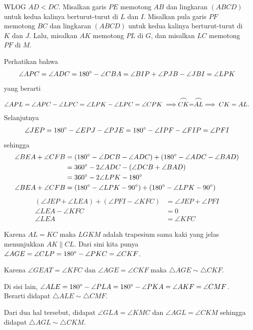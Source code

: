 WLOG $AD < DC$. Misalkan garis $PE$ memotong $AB$ dan lingkaran $(ABCD)$ untuk kedua kalinya berturut-turut di $L$ dan $I$. Misalkan pula garis $PF$ memotong $BC$ dan lingkaran $(ABCD)$ untuk kedua kalinya berturut-turut di $K$ dan $J$. Lalu, misalkan $AK$ memotong $PL$ di $G$, dan misalkan $LC$ memotong $PF$ di $M$.

Perhatikan bahwa
\begin{align*}
    \angle APC = \angle ADC = 180^\circ - \angle CBA = \angle BIP + \angle PJB - \angle JBI = \angle LPK
\end{align*}
yang berarti
\begin{align*}
    \angle APL = \angle APC - \angle LPC = \angle LPK - \angle LPC = \angle CPK \implies \stackrel{\mbox{\large$\frown$}}{CK} = \stackrel{\mbox{\large$\frown$}}{AL} \implies CK = AL.
\end{align*}
Selanjutnya
\begin{align*}
    \angle JEP = 180^\circ - \angle EPJ - \angle PJE = 180^\circ - \angle IPF - \angle FIP = \angle PFI
\end{align*}
sehingga
\begin{align*}
    \angle BEA + \angle CFB &= (180^\circ - \angle DCB - \angle ADC) + (180^\circ - \angle ADC - \angle BAD)\\
    &= 360^\circ - 2\angle ADC - (\angle DCB + \angle BAD)\\
    &= 360^\circ  - 2\angle LPK - 180^\circ\\
    \angle BEA + \angle CFB &= (180^\circ - \angle LPK - 90^\circ) + (180^\circ - \angle LPK - 90^\circ)
\end{align*}
\begin{align*}
     (\angle JEP + \angle LEA) + (\angle PFI - \angle KFC)  &= \angle JEP + \angle PFI\\
     \angle LEA - \angle KFC &= 0\\
     \angle LEA &= \angle KFC
\end{align*}

Karena $AL = KC$ maka $LGKM$ adalah trapesium sama kaki yang jelas menunjukkan $AK \parallel CL$. Dari sini kita punya
$\angle AGE = \angle CLP = 180^\circ - \angle PKC = \angle CKF$.

Karena $\angle GEA T= \angle KFC$ dan $\angle AGE = \angle CKF$ maka $\triangle AGE \sim \triangle CKF$.

Di sisi lain, $\angle ALE = 180^\circ - \angle PLA = 180^\circ - \angle PKA = \angle AKF = \angle CMF$. Berarti didapat $\triangle ALE \sim \triangle CMF$.

Dari dua hal tersebut, didapat $\angle GLA = \angle KMC$ dan $\angle AGL = \angle CKM$ sehingga didapat $\triangle AGL \sim \triangle CKM$.

